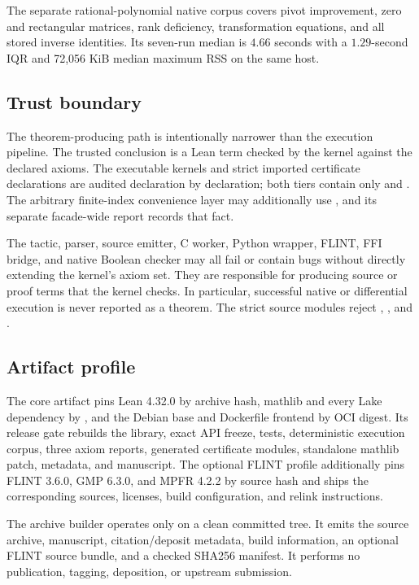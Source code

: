 The separate rational-polynomial native corpus covers pivot improvement, zero
and rectangular matrices, rank deficiency, transformation equations, and all
stored inverse identities. Its seven-run median is \(4.66\) seconds with a
\(1.29\)-second IQR and 72,056 KiB median maximum RSS on the same host.

\subsection{Trust boundary}

The theorem-producing path is intentionally narrower than the execution
pipeline. The trusted conclusion is a Lean term checked by the kernel against
the declared axioms. The executable  kernels and strict imported
certificate declarations are audited declaration by declaration; both tiers
contain only  and . The arbitrary finite-index
convenience layer may additionally use , and its
separate facade-wide report records that fact.

The  tactic, parser, source emitter, C worker, Python wrapper,
FLINT, FFI bridge, and native Boolean checker may all fail or contain bugs
without directly extending the kernel's axiom set. They are responsible for
producing source or proof terms that the kernel checks. In particular,
successful native or differential execution is never reported as a theorem.
The strict source modules reject ,
, and .

\subsection{Artifact profile}

The core artifact pins Lean 4.32.0 by archive hash, mathlib and every Lake
dependency by , and the Debian base and Dockerfile
frontend by OCI digest. Its release gate rebuilds the library, exact API
freeze, tests, deterministic execution corpus, three axiom reports, generated
certificate modules, standalone mathlib patch, metadata, and manuscript. The
optional FLINT profile additionally pins FLINT 3.6.0, GMP 6.3.0, and MPFR
4.2.2 by source hash and ships the corresponding sources, licenses, build
configuration, and relink instructions.

The archive builder operates only on a clean committed tree. It emits the
source archive, manuscript, citation/deposit metadata, build information, an
optional FLINT source bundle, and a checked SHA256 manifest. It performs no
publication, tagging, deposition, or upstream submission.
